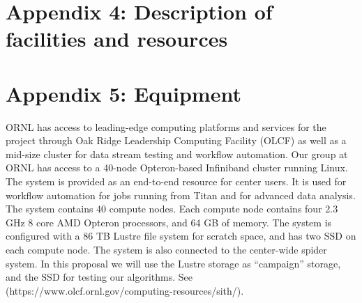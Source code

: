 \documentclass[11pt,titlepage]{report}
\begin{document}
{\section*{Appendix 4: Description of facilities and resources}

 
\clearpage
\markboth{}{}
{}
\section*{Appendix 5: Equipment}
\label{app:equipment5}
\vspace{2ex}
\noindent
ORNL has access to leading-edge computing platforms and services for the project through Oak Ridge Leadership Computing Facility (OLCF) as well as a mid-size cluster for data stream testing and workflow automation.
Our group at ORNL has access to a 40-node Opteron-based Infiniband cluster running Linux. The system is provided as an end-to-end resource for center users. It is used for workflow automation for jobs running from Titan and for advanced data analysis. The system contains 40 compute nodes. Each compute node contains four 2.3 GHz 8 core AMD Opteron processors, and 64 GB of memory. The system is configured with a 86 TB Lustre file system for scratch space, and has two SSD on each compute node.
The system is also connected to the center-wide spider system. In this proposal we will use the Lustre storage as ``campaign''
storage, and the SSD for testing our algorithms. See (https://www.olcf.ornl.gov/computing-resources/sith/).

\clearpage
\markboth{}{}




%
%
%
%
%
%
%
%
%
%
%
%
%
%
%
%
%   

}
\end{document}
